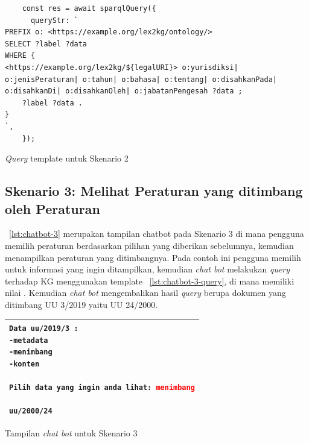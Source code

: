 \begin{listing}[H]
  \begin{verbatim}
    const res = await sparqlQuery({
      queryStr: `
PREFIX o: <https://example.org/lex2kg/ontology/>
SELECT ?label ?data
WHERE {
<https://example.org/lex2kg/${legalURI}> o:yurisdiksi| o:jenisPeraturan| o:tahun| o:bahasa| o:tentang| o:disahkanPada| o:disahkanDi| o:disahkanOleh| o:jabatanPengesah ?data ;
    ?label ?data .
}
`,
    });
  \end{verbatim}
  \caption{\textit{Query} template untuk Skenario 2}
  \label{lst:chatbot-2-query}
\end{listing}

\subsection{Skenario 3: Melihat Peraturan yang ditimbang oleh Peraturan}
\label{subsec:skenario-3}

\lst~\ref{lst:chatbot-3} merupakan tampilan chatbot pada Skenario 3 di mana pengguna memilih
peraturan berdasarkan pilihan yang diberikan sebelumnya, kemudian menampilkan peraturan yang
ditimbangnya. Pada contoh ini pengguna memilih  untuk informasi yang ingin
ditampilkan, kemudian \textit{chat bot} melakukan \textit{query} terhadap KG menggunakan template
\lst~\ref{lst:chatbot-3-query}, di mana  memiliki nilai . Kemudian
\textit{chat bot} mengembalikan hasil \textit{query} berupa dokumen yang ditimbang UU 3/2019 yaitu
UU 24/2000.

\begin{listing}[H]
  \begin{center}
    \begin{tabular}{|p{}|}
      \hline
      \makecell[l]{
        \texttt{Data uu/2019/3 :}                                             \\
        \texttt{-metadata}                                                    \\
        \texttt{-menimbang}                                                   \\
        \texttt{-konten}                                                      \\
        \\
        \texttt{Pilih data yang ingin anda lihat: \textcolor{red}{menimbang}} \\
        \\
        \texttt{uu/2000/24}
      }                                                                       \\
      \hline
    \end{tabular}
  \end{center}
  \caption{Tampilan \textit{chat bot} untuk Skenario 3}
  \label{lst:chatbot-3}
\end{listing}

